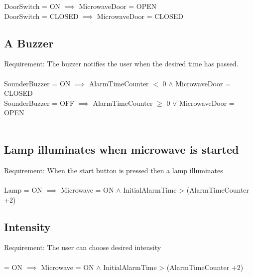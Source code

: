 DoorSwitch = ON  $\implies$ MicrowaveDoor = OPEN  \\
DoorSwitch = CLOSED $\implies$ MicrowaveDoor = CLOSED \\


\subsection{A Buzzer}
Requirement: The buzzer notifies the user when the desired time has passed. \\
 \\
SounderBuzzer = ON $\implies$ AlarmTimeCounter $<$ 0 $\wedge$ MicrowaveDoor = CLOSED \\
SounderBuzzer = OFF $\implies$ AlarmTimeCounter $\geq$ 0 $\vee$ MicrowaveDoor = OPEN   \\
\\

\subsection{Lamp illuminates when microwave is started}
Requirement: When the start button is pressed then a lamp illuminates \\
\\
Lamp = ON  $\implies$ Microwave = ON $\wedge$ InitialAlarmTime > (AlarmTimeCounter +2) \\


\subsection{Intensity}
Requirement: The user can choose desired intensity \\
\\
 = ON  $\implies$ Microwave = ON $\wedge$ InitialAlarmTime > (AlarmTimeCounter +2) \\


